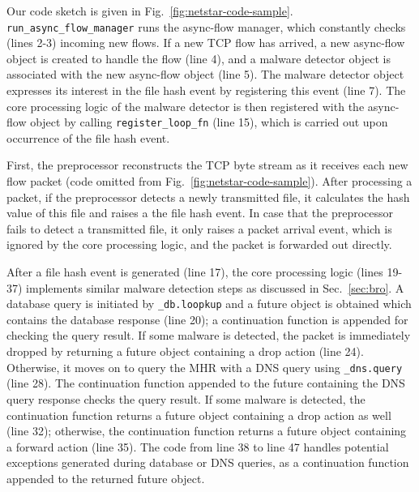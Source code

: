 Our code sketch is given in Fig.~\ref{fig:netstar-code-sample}. \lstinline[style=InlineStyle]{run_async_flow_manager} runs the async-flow manager, which constantly checks (lines 2-3) incoming new flows. If a new TCP flow has arrived, %
a new async-flow object is created to handle the flow (line 4), and a malware detector object is associated with the new async-flow object (line 5). The malware detector object expresses its interest in the file hash event by registering this event %
(line 7). The core processing logic of the malware detector is then registered with the async-flow object by calling \lstinline[style=InlineStyle]{register_loop_fn} (line 15),
which is carried out upon occurrence of the file hash event.


First, the preprocessor %
reconstructs the TCP byte stream as it receives each new flow packet (code omitted from Fig.~\ref{fig:netstar-code-sample}). After processing a packet, if the preprocessor detects a newly transmitted file, it calculates the hash value of this file and raises a the file hash event. %
In case that the preprocessor fails to detect a transmitted file, it only raises a packet arrival event, which is ignored by the core processing logic, %
 and the packet is forwarded out directly.

After a file hash event is generated (line 17), the core processing logic %
(lines 19-37) implements similar malware detection steps as discussed in Sec.~\ref{sec:bro}.
A database query is initiated by \lstinline[style=InlineStyle]{_db.loopkup} and a future object is obtained which contains the database response (line 20); a continuation function is appended for checking the query result. If some malware is detected, the packet is immediately dropped by returning a future object containing a drop action (line 24). Otherwise, it moves on to query the MHR with a DNS query using \lstinline[style=InlineStyle]{_dns.query} (line 28). The continuation function appended to the future containing the DNS query response checks the query result. If some malware is detected, the continuation function returns a future object containing a drop action as well (line 32); otherwise, the continuation function returns a future object containing a forward action (line 35). The code from line 38 to line 47 handles potential exceptions generated during database or DNS queries, as a continuation function appended to the returned future object.

